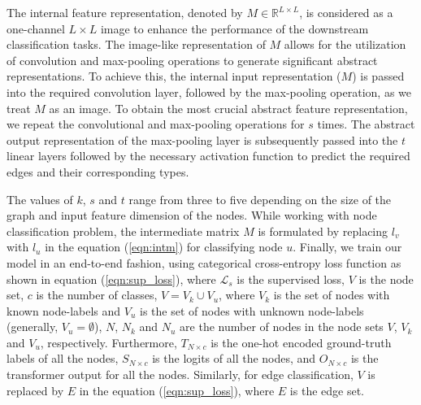 The internal feature representation, denoted by $M\in \mathbb{R}^{L \times L}$, is considered as a one-channel $L \times L$ image to enhance the performance of the downstream classification tasks. The image-like representation of $M$ allows for the utilization of convolution and max-pooling operations to generate significant abstract representations. To achieve this, the internal input representation ($M$) is passed into the required convolution layer, followed by the max-pooling operation, as we treat $M$ as an image. To obtain the most crucial abstract feature representation, we repeat the convolutional and max-pooling operations for $s$ times. The abstract output representation of the max-pooling layer is subsequently passed into the $t$ linear layers followed by the necessary activation function to predict the required edges and their corresponding types.
\begin{comment}
\begin{align}
\begin{aligned}
J_1 & = ReLU(MaxPool(Conv2D_1(M)))\\
J_2 & = ReLU(MaxPool(Conv2D_2(J_1)))\\
\vdots \\
J_s & = ReLU(MaxPool(Conv2D_s(J_{s-1})))
\end{aligned}
&&
\begin{aligned}
Y_0 & = Flatten(J_s)\\
Y_1 & = ReLU(Linear_1(Y_0))\\
\vdots \\
Y_t & = Softmax/Sigmoid(Linear_t(Y_{t-1}))
\end{aligned}
\end{align}
\end{comment}
The values of $k$, $s$ and $t$ range from three to five depending on the size of the graph and input feature dimension of the nodes. While working with node classification problem, the intermediate matrix $M$ is formulated by replacing $l_v$ with $l_u$ in the equation (\ref{eqn:intm}) for classifying node $u$. Finally, we train our model in an end-to-end fashion, using categorical cross-entropy loss function as shown in equation (\ref{eqn:sup_loss}), where $\mathcal{L}_s$ is the supervised loss, $V$ is the node set, $c$ is the number of classes, $V=V_k \cup V_u$, where $V_k$ is the set of nodes with known node-labels and $V_u$ is the set of nodes with unknown node-labels (generally, $V_u=\emptyset$), $N$, $N_k$ and $N_u$ are the number of nodes in the node sets $V$, $V_k$ and $V_u$, respectively. Furthermore, $T_{N\times c}$ is the one-hot encoded ground-truth labels of all the nodes, $S_{N\times c}$ is the logits of all the nodes, and $O_{N\times c}$ is the transformer output for all the nodes. Similarly, for edge classification, $V$ is replaced by $E$ in the equation (\ref{eqn:sup_loss}), where $E$ is the edge set.
